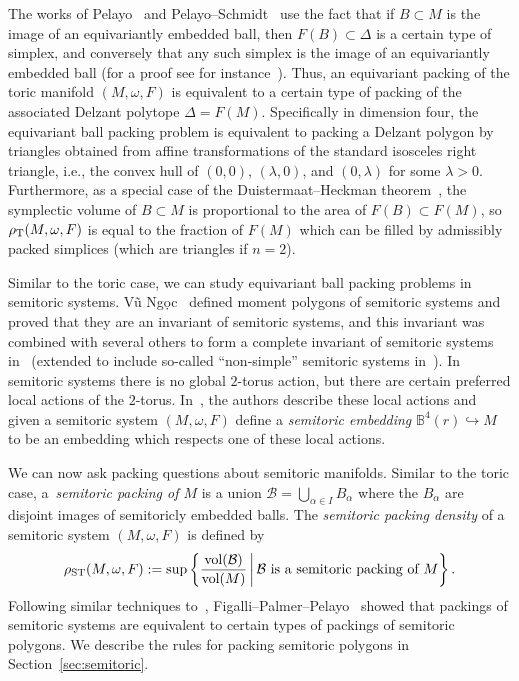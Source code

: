 \documentclass[10pt,a4paper]{amsart}
\numberwithin{equation}{section}
\newcommand{\De}{\Delta}
\newcommand{\om}{\omega}
\theoremstyle{definition}
\theoremstyle{plain}
\theoremstyle{plain}
\begin{document}
The works of Pelayo~\cite{Pe2006,Pe2007} and Pelayo--Schmidt~\cite{PeSc2008} use the fact that if $B\subset M$ is the image of an equivariantly embedded ball, then $F(B) \subset \De$ is a certain type of simplex, and conversely that any such simplex is the image of an equivariantly embedded ball (for a proof see for instance~\cite[Lemma 2.13]{PeSc2008}).
Thus, an equivariant packing of the toric manifold $(M,\om,F)$ is equivalent to a certain type of packing of the associated Delzant polytope $\De = F(M)$.
Specifically in dimension four, the equivariant ball packing problem is equivalent to packing a Delzant polygon by triangles obtained from affine transformations of the standard isosceles right triangle, i.e., the convex hull of $(0,0)$, $(\lambda,0)$, and $(0,\lambda)$ for some $\lambda>0$.
Furthermore, as a special case of the Duistermaat--Heckman theorem~\cite{DH-measure}, the symplectic volume of $B\subset M$ is proportional to the area of $F(B)\subset F(M)$, so $\rho_{{\rm T}}(M,\om,F)$ is equal to the fraction of $F(M)$ which can be filled by admissibly packed simplices (which are triangles if $n=2$).

Similar to the toric case, we can study equivariant ball packing problems in semitoric systems. V\~{u} Ng\d{o}c~\cite{VN2007} defined moment polygons of semitoric systems and proved that they are an invariant of semitoric systems, and this invariant was combined with several others to form a complete invariant of semitoric systems in~\cite{PeVN2009, PeVN2011} (extended to include so-called ``non-simple'' semitoric systems in~\cite{PPT-nonsimple}).
In semitoric systems there is no global $2$-torus action, but there are certain preferred local actions of the $2$-torus. In~\cite[Section 5]{FiPaPe2016}, the authors describe these local actions and given a semitoric system $(M,\om,F)$ define a \emph{semitoric embedding} $\mathbb{B}^4(r)\hookrightarrow M$ to be an embedding which respects one of these local actions.

We can now ask packing questions about semitoric manifolds.
Similar to the toric case, a~\emph{semitoric packing of $M$} is a union $\mathcal{B} = \bigcup_{\alpha\in I} B_\alpha$ where the $B_\alpha$ are disjoint images of semitoricly embedded balls.
The \emph{semitoric packing density} of a semitoric system $(M,\om,F)$ is defined by
\begin{equation}\label{eqn:maximal-semitoric-packing}
 \rho_{{\rm ST}}(M,\om,F) := \mathrm{sup} \left\{\frac{\text{vol}(\mathcal{B})}{\text{vol}(M)} \,  \bigg| \,  \mathcal{B} \text{ is a semitoric packing of $M$}\right\}.
\end{equation}
Following similar techniques to~\cite{Pe2006, Pe2007}, Figalli--Palmer--Pelayo~\cite{FiPaPe2016} showed that packings of semitoric systems are equivalent to certain types of packings of semitoric polygons.
We describe the rules for packing semitoric polygons in Section~\ref{sec:semitoric}.
\end{document}
